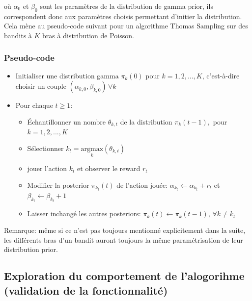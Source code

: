 \documentclass[letterpaper,11pt]{article}
\begin{document}
où $\alpha_0$ et $\beta_0$ sont les paramètres de la distribution de gamma prior, ils correspondent donc aux paramètres choisis permettant d'initier la distribution.\\

Cela mène au pseudo-code suivant pour un algorithme Thomas Sampling sur des bandits à $K$ bras à distribution de Poisson.

\subsubsection{Pseudo-code}

\begin{itemize}
\setlength\itemsep{0.2cm}

\item
Initialiser une distribution gamma $\pi_k(0)$ pour $k=1,2,...,K$, c'est-à-dire choisir un couple $(\alpha_{k,0}, \beta_{k,0})\, \forall{k}$

\item Pour chaque $t\geq 1:$

\begin{itemize}
\item
Échantillonner un nombre $\theta_{k,t}$ de la distribution $\pi_k(t-1),$ pour $k=1,2,...,K$

\item
Sélectionner $k_t=\underset{k}{\mathrm{argmax}} (\theta_{k,t})$ 

\item
jouer l'action $k_t$ et observer le reward $r_t$ 

\item 
Modifier la posterior $\pi_{k_t}(t)$ de l'action jouée: $\alpha_{k_t} \leftarrow \alpha_{k_t}+ r_t$ et $\beta_{k_t}  \leftarrow \beta_{k_t} + 1$ 

\item
Laisser inchangé les autres posteriors: $\pi_{k}(t) \leftarrow \pi_{k}(t-1),\, \forall k\neq k_t$

\end{itemize}

\end{itemize}

\vspace*{0.2cm}
Remarque: même si ce n'est pas toujours mentionné explicitement dans la suite, les différents bras d'un bandit auront toujours la même paramétrisation de leur distribution prior.

\subsection{Exploration du comportement de l'alogorihme (validation de la fonctionnalité)}
\end{document}
